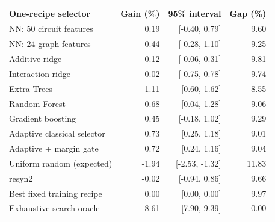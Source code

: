 \begin{tabular}{@{}lrrr@{}}
\toprule
\textbf{One-recipe selector} & \textbf{Gain (\%)} & \textbf{95\% interval} & \textbf{Gap (\%)} \\
\midrule
NN: 50 circuit features & 0.19 & [-0.40, 0.79] & 9.60 \\
NN: 24 graph features & 0.44 & [-0.28, 1.10] & 9.25 \\
Additive ridge & 0.12 & [-0.06, 0.31] & 9.81 \\
Interaction ridge & 0.02 & [-0.75, 0.78] & 9.74 \\
Extra-Trees & 1.11 & [0.60, 1.62] & 8.55 \\
Random Forest & 0.68 & [0.04, 1.28] & 9.06 \\
Gradient boosting & 0.45 & [-0.18, 1.02] & 9.29 \\
Adaptive classical selector & 0.73 & [0.25, 1.18] & 9.01 \\
Adaptive + margin gate & 0.72 & [0.24, 1.16] & 9.04 \\
Uniform random (expected) & -1.94 & [-2.53, -1.32] & 11.83 \\
resyn2 & -0.02 & [-0.94, 0.86] & 9.66 \\
Best fixed training recipe & 0.00 & [0.00, 0.00] & 9.97 \\
Exhaustive-search oracle & 8.61 & [7.90, 9.39] & 0.00 \\
\bottomrule
\end{tabular}
